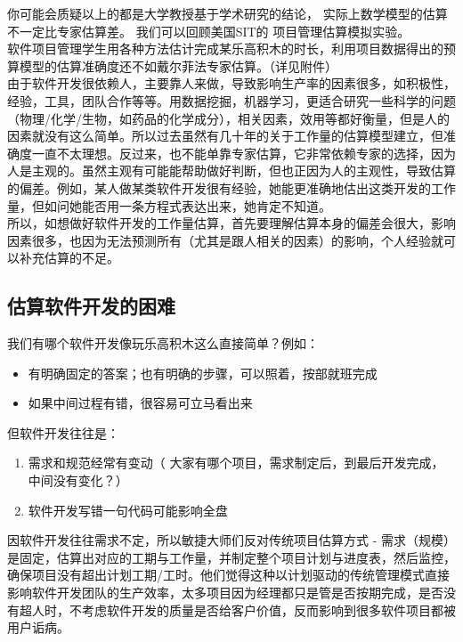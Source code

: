 你可能会质疑以上的都是大学教授基于学术研究的结论，
实际上数学模型的估算不一定比专家估算差。 我们可以回顾美国SIT的
项目管理估算模拟实验。\\
软件项目管理学生用各种方法估计完成某乐高积木的时长，利用项目数据得出的预算模型的估算准确度还不如戴尔菲法专家估算。（详见附件）\\
由于软件开发很依赖人，主要靠人来做，导致影响生产率的因素很多，如积极性，经验，工具，团队合作等等。用数据挖掘，机器学习，更适合研究一些科学的问题
（物理/化学/生物，如药品的化学成分），相关因素，效用等都好衡量，但是人的因素就没有这么简单。所以过去虽然有几十年的关于工作量的估算模型建立，但准确度一直不太理想。反过来，也不能单靠专家估算，它非常依赖专家的选择，因为人是主观的。虽然主观有可能能帮助做好判断，但也正因为人的主观性，导致估算的偏差。例如，某人做某类软件开发很有经验，她能更准确地估出这类开发的工作量，但如问她能否用一条方程式表达出来，她肯定不知道。\\
所以，如想做好软件开发的工作量估算，首先要理解估算本身的偏差会很大，影响因素很多，也因为无法预测所有（尤其是跟人相关的因素）的影响，个人经验就可以补充估算的不足。

\hypertarget{ux4f30ux7b97ux8f6fux4ef6ux5f00ux53d1ux7684ux56f0ux96be}{%
\subsection{估算软件开发的困难}\label{ux4f30ux7b97ux8f6fux4ef6ux5f00ux53d1ux7684ux56f0ux96be}}

我们有哪个软件开发像玩乐高积木这么直接简单？例如：

\begin{itemize}
\tightlist
\item
  有明确固定的答案；也有明确的步骤，可以照着，按部就班完成
\item
  如果中间过程有错，很容易可立马看出来
\end{itemize}

但软件开发往往是：

\begin{enumerate}
\tightlist
\item
  需求和规范经常有变动（
  大家有哪个项目，需求制定后，到最后开发完成，中间没有变化？）
\item
  软件开发写错一句代码可能影响全盘
\end{enumerate}

因软件开发往往需求不定，所以敏捷大师们反对传统项目估算方式 -
需求（规模）是固定，估算出对应的工期与工作量，并制定整个项目计划与进度表，然后监控，确保项目没有超出计划工期/工时。他们觉得这种以计划驱动的传统管理模式直接影响软件开发团队的生产效率，太多项目因为经理都只是管是否按期完成，是否没有超人时，不考虑软件开发的质量是否给客户价值，反而影响到很多软件项目都被用户诟病。

